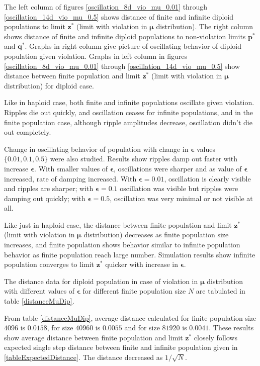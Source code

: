 
The left column of figures \ref{oscillation_8d_vio_mu_0.01} through \ref{oscillation_14d_vio_mu_0.5} 
shows distance of finite and infinite diploid populations to limit $\bm{z^\ast}$ (limit with violation in $\bm{\mu}$ distribution). The 
right column shows distance of finite and infinite diploid populations to non-violation limits $\bm{p^\ast}$ and $\bm{q^\ast}$. 
Graphs in right column give picture of oscillating behavior of diploid population given violation. 
Graphs in left column in figures \ref{oscillation_8d_vio_mu_0.01} through \ref{oscillation_14d_vio_mu_0.5} show distance 
between finite population and limit $\bm{z}^\ast$ (limit with violation in $\bm{\mu}$ distribution) for diploid case.

Like in haploid case, both finite and infinite populations oscillate given violation. Ripples die out quickly, 
and oscillation ceases for infinite populations, and in the finite population case, although ripple amplitudes decrease, 
oscillation didn't die out completely. 

Change in oscillating behavior of population with change in $\bm{\epsilon}$ values $\{0.01, 0.1, 0.5\}$ were also studied. 
Results show ripples damp out faster with increase $\bm{\epsilon}$.
With smaller values of $\bm{\epsilon}$, oscillations were sharper and as value of $\bm{\epsilon}$ increased, 
rate of damping increased. With $\bm{\epsilon} = 0.01$, oscillation is clearly visible and ripples are sharper; with $\bm{\epsilon} = 0.1$ oscillation was visible 
but ripples were damping out quickly;  with $\bm{\epsilon} = 0.5$, oscillation was very minimal or not visible at all. 

Like just in haploid case, the distance between finite population and limit $\bm{z}^\ast$ (limit with violation in $\bm{\mu}$ distribution) 
decreases as finite population size increases, 
and finite population shows behavior similar to infinite population behavior as finite population reach large number. 
Simulation results show infinite population converges 
to limit $\bm{z^\ast}$ quicker with increase in $\bm{\epsilon}$. 

The distance data for diploid population in case of violation in $\bm{\mu}$ distribution 
with different values of $\bm{\epsilon}$ for different finite population size $N$ are tabulated in table \ref{distanceMuDip}.



From table \ref{distanceMuDip}, average distance calculated for finite population size $4096$ is $0.0158$, 
for size $40960$ is $0.0055$ and for size $81920$ is $0.0041$. These results show average distance 
between finite population and limit $\bm{z^\ast}$ closely follows expected single step distance 
between finite and infinite population given in \ref{tableExpectedDistance}. The distance decreased as $1/\sqrt{N}$.

